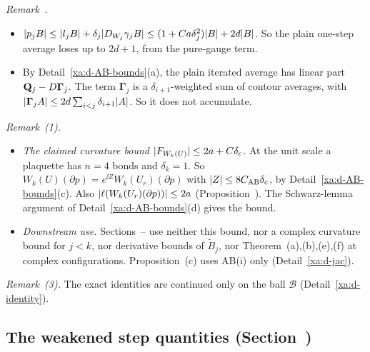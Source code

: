 \begin{detail}\label{xa:d-AB-rem}
\emph{Remark~.}
\begin{itemize}
\item $\lvert p_jB\rvert\le\lvert l_jB\rvert+\delta_j\lvert D_{W_j}\gamma_jB\rvert\le(1+Ca\delta_j^2)\lvert B\rvert+2d\lvert B\rvert$. So the plain one-step average loses up to $2d+1$, from the pure-gauge term.
\item By Detail~\ref{xa:d-AB-bounds}(a), the plain iterated average has linear part $\mathbf Q_j-D\boldsymbol\Gamma_j$. The term $\boldsymbol\Gamma_j$ is a $\delta_{i+1}$-weighted sum of contour averages, with $\lvert\boldsymbol\Gamma_jA\rvert\le2d\sum_{i<j}\delta_{i+1}\lvert A\rvert$. So it does not accumulate.
\end{itemize}

\emph{Remark~(1).}
\begin{itemize}
\item \emph{The claimed curvature bound $\lvert F_{W_k(U)}\rvert\le2a+C\delta_c$.} At the unit scale a plaquette has $n=4$ bonds and $\delta_k=1$. So $W_k(U)(\partial p)=e^{\ii Z}W_k(U_r)(\partial p)$ with $\lvert Z\rvert\le8C_{\rm AB}\delta_c$, by Detail~\ref{xa:d-AB-bounds}(c). Also $\lvert\ell(W_k(U_r)(\partial p))\rvert\le2a$ (Proposition~). The Schwarz-lemma argument of Detail~\ref{xa:d-AB-bounds}(d) gives the bound.
\item \emph{Downstream use.} Sections~-- use neither this bound, nor a complex curvature bound for $j<k$, nor derivative bounds of $\tilde B_j$, nor Theorem~(a),(b),(e),(f) at complex configurations. Proposition~(c) uses AB(i) only (Detail~\ref{xa:d-jac}).
\end{itemize}

\emph{Remark~(3).} The exact identities are continued only on the ball $\mathcal B$ (Detail~\ref{xa:d-identity}).
\end{detail}

\subsection{The weakened step quantities (Section~\texorpdfstring{}{47})}\label{xa:sec-sq}

